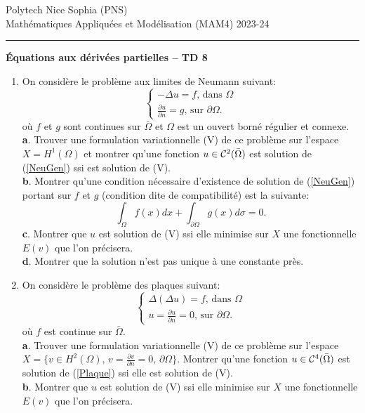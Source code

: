 \documentclass[12pt,a4paper]{article}
\begin{document}
 \hfill Polytech Nice Sophia (PNS)\\
\noindent Math\'ematiques Appliqu\'ees et Mod\'elisation (MAM4) \hfill 2023-24 \\

\hrule

\bigskip
\bigskip

\begin{center}{\bf \'Equations aux d\'eriv\'ees partielles --
TD 8}\end{center}

\bigskip
\begin{enumerate}
\item On consid\`ere le probl\`eme aux limites de Neumann suivant:
\begin{equation}\label{NeuGen}
\begin{cases}
-\Delta u = f,\,\text{dans }\Omega\\
\frac{\partial u}{\partial n} = g,\,\text{sur }\partial\Omega.
\end{cases}
\end{equation}
o\`u $f$ et $g$ sont continues sur $\bar\Omega$ et $\Omega$ est un ouvert born\'e r\'egulier et connexe.\\
{\bf a}. Trouver une formulation variationnelle (V) de ce probl\`eme sur l'espace $X=H^1(\Omega)$ et montrer qu'une fonction $u\in{\cal C}^2(\bar\Omega)$ est solution de (\ref{NeuGen}) ssi est solution de (V).\\
{\bf b}. Montrer qu'une condition n\'ecessaire d'existence de solution
de (\ref{NeuGen}) portant sur $f$ et $g$ (condition dite de
compatibilit\'e) est la suivante:
$$
\int_{\Omega}f(x)dx+ \int_{\partial\Omega} g(x)d\sigma= 0.
$$
{\bf c}. Montrer que $u$ est solution de (V) ssi elle minimise sur $X$ une fonctionnelle $E(v)$ que l'on pr\'ecisera.\\
{\bf d}. Montrer que la solution n'est pas unique à une constante pr\`es. 

\item On consid\`ere le probl\`eme des plaques suivant:
\begin{equation}\label{Plaque}
\begin{cases}
\Delta(\Delta u) = f,\,\text{dans }\Omega\\
u = \frac{\partial u}{\partial n} = 0,\,\text{sur }\partial\Omega.
\end{cases}
\end{equation}
o\`u $f$ est continue sur $\bar\Omega$.\\
{\bf a}. Trouver une formulation variationnelle (V) de ce probl\`eme sur l'espace $X=\{v\in H^2(\Omega),\, v=\frac{\partial v}{\partial n}=0,\, \partial\Omega\}$. Montrer qu'une fonction $u\in{\cal C}^4(\bar\Omega)$ est solution de (\ref{Plaque}) ssi elle est solution de (V).\\
{\bf b}. Montrer que $u$ est solution de (V) ssi elle minimise sur $X$ une fonctionnelle $E(v)$ que l'on pr\'ecisera.\\


\end{enumerate}
\end{document}
